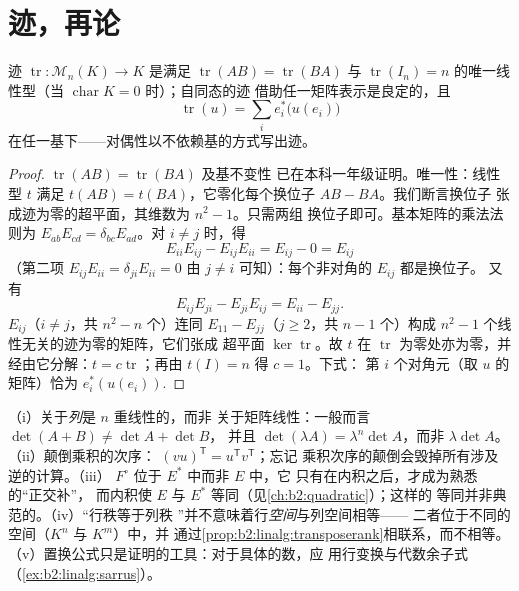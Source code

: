 \section{迹，再论}

\begin{proposition}\label{prop:b2:linalg:trace}
迹 $\operatorname{tr} \colon \mathcal{M}_n(K) \to K$ 是满足
$\operatorname{tr}(AB) =
\operatorname{tr}(BA)$ 与 $\operatorname{tr}(I_n) = n$ 的唯一线性型（当
$\operatorname{char} K = 0$ 时）；自同态的迹
借助任一矩阵表示是良定的，且
\[
\operatorname{tr}(u) = \sum_{i} e_i^*\bigl(u(e_i)\bigr)
\]
在任一基下——对偶性以不依赖基的方式写出迹。
\end{proposition}

\begin{proof}
$\operatorname{tr}(AB) = \operatorname{tr}(BA)$ 及基不变性
已在本科一年级证明。唯一性：线性型 $t$ 满足 $t(AB) =
t(BA)$，它零化每个换位子 $AB - BA$。我们断言换位子
张成迹为零的超平面，其维数为 $n^2 - 1$。只需两组
换位子即可。基本矩阵的乘法法则为
$E_{ab}E_{cd} = \delta_{bc}E_{ad}$。对
$i \neq j$ 时，得
\[
E_{ii}E_{ij} - E_{ij}E_{ii} = E_{ij} - 0 = E_{ij}
\]
（第二项 $E_{ij}E_{ii} = \delta_{ji}E_{ii} = 0$
由 $j \neq i$ 可知）：每个非对角的 $E_{ij}$ 都是换位子。
又有
\[
E_{ij}E_{ji} - E_{ji}E_{ij} = E_{ii} - E_{jj} .
\]
$E_{ij}$（$i \neq j$，共 $n^2 - n$ 个）连同
$E_{11} - E_{jj}$（$j \geq 2$，共 $n - 1$ 个）构成
$n^2 - 1$ 个线性无关的迹为零的矩阵，它们张成
超平面 $\ker\operatorname{tr}$。故 $t$ 在
$\operatorname{tr}$ 为零处亦为零，并经由它分解：$t =
c\operatorname{tr}$；再由 $t(I) = n$ 得 $c = 1$。下式：
第 $i$ 个对角元（取 $u$ 的矩阵）恰为
$e_i^*(u(e_i))$.
\end{proof}

\begin{remark}[常见误区]\label{rem:b2:linalg:pitfalls}
（i）关于\emph{列}是 $n$ 重线性的，而非
关于矩阵线性：一般而言 $\det(A + B) \neq \det A + \det B$，
并且 $\det(\lambda A) = \lambda^n\det A$，而非
$\lambda\det A$。（ii）颠倒乘积的次序：
$(vu)^{\mathsf T} = u^{\mathsf T}v^{\mathsf T}$；忘记
乘积次序的颠倒会毁掉所有涉及逆的计算。（iii） $F^\circ$
位于 $E^*$ 中而非 $E$ 中，它
只有在内积之后，才成为熟悉的“正交补”，
而内积使 $E$ 与 $E^*$ 等同（见\cref{ch:b2:quadratic}）；这样的
等同并非典范的。（iv）“行秩等于列秩
”并不意味着行\emph{空间}与列空间相等——
二者位于不同的空间（$K^n$ 与 $K^m$）中，并
通过\cref{prop:b2:linalg:transposerank}相联系，而不相等。
（v）置换公式只是证明的工具：对于具体的数，应
用行变换与代数余子式（\cref{ex:b2:linalg:sarrus}）。
\end{remark}

